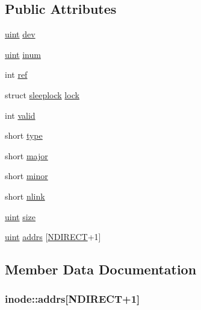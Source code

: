 \subsection*{Public Attributes}
\begin{DoxyCompactItemize}
\item 
\hyperlink{types_8h_a91ad9478d81a7aaf2593e8d9c3d06a14}{uint} \hyperlink{structinode_a121742a89c4531f03a7de1613d5be605}{dev}
\item 
\hyperlink{types_8h_a91ad9478d81a7aaf2593e8d9c3d06a14}{uint} \hyperlink{structinode_a8acc2b9df0bfc6856da62925763db7fe}{inum}
\item 
int \hyperlink{structinode_a6a519028ee67f805482b3e1725bf09c5}{ref}
\item 
struct \hyperlink{structsleeplock}{sleeplock} \hyperlink{structinode_a46bad0e938fbd348ac02bdef0c8d6215}{lock}
\item 
int \hyperlink{structinode_aad324382ba30eb83daa5304fce7dca08}{valid}
\item 
short \hyperlink{structinode_a8d74bec2898785c057111c328d23fda2}{type}
\item 
short \hyperlink{structinode_a34af7242018a977dace5730683850875}{major}
\item 
short \hyperlink{structinode_a37878866e7905b666db2aa33076076a2}{minor}
\item 
short \hyperlink{structinode_af8b88b409bea7ef99c49a55f387538b2}{nlink}
\item 
\hyperlink{types_8h_a91ad9478d81a7aaf2593e8d9c3d06a14}{uint} \hyperlink{structinode_a918af769c48a8ca8afac057bf83d12de}{size}
\item 
\hyperlink{types_8h_a91ad9478d81a7aaf2593e8d9c3d06a14}{uint} \hyperlink{structinode_a7ba4ab7e52404b80d6d854678715ae30}{addrs} \mbox{[}\hyperlink{fs_8h_acd38e9532d4b3623f844b93c012a8e06}{N\+D\+I\+R\+E\+CT}+1\mbox{]}
\end{DoxyCompactItemize}


\subsection{Member Data Documentation}
\subsubsection[{\texorpdfstring{addrs}{addrs}}]{ inode\+::addrs\mbox{[}{\bf N\+D\+I\+R\+E\+CT}+1\mbox{]}}\hypertarget{structinode_a7ba4ab7e52404b80d6d854678715ae30}{}\label{structinode_a7ba4ab7e52404b80d6d854678715ae30}
